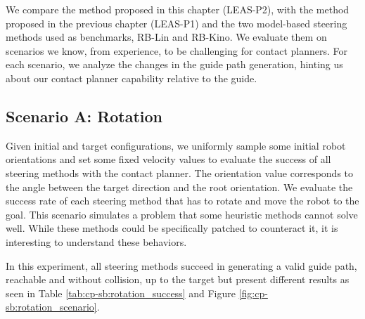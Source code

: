 We compare the method proposed in this chapter (LEAS-P2), with the method proposed in the previous chapter (LEAS-P1) and the two model-based steering methods used as benchmarks, RB-Lin and RB-Kino. We evaluate them on scenarios we know, from experience, to be challenging for contact planners. For each scenario, we analyze the changes in the guide path generation, hinting us about our contact planner capability relative to the guide.

\subsection{Scenario A: Rotation\label{subsub:sbcp:rotation}}
Given initial and target configurations, we uniformly sample some initial robot orientations and set some fixed velocity values to evaluate the success of all steering methods with the contact planner. The orientation value corresponds to the angle between the target direction and the root orientation. 
We evaluate the success rate of each steering method that has to rotate and move the robot to the goal. 
This scenario simulates a problem that some heuristic methods cannot solve well. While these methods could be specifically patched to counteract it, it is interesting to understand these behaviors.

In this experiment, all steering methods succeed in generating a valid guide path, reachable and without collision, up to the target but present different results as seen in Table \ref{tab:cp-sb:rotation_success} and Figure \ref{fig:cp-sb:rotation_scenario}. 

